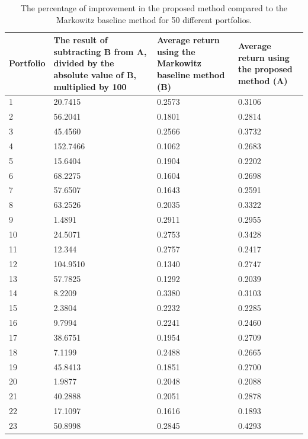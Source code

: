 \documentclass[preprint,12pt,authoryear]{elsarticle}
\begin{document}
\begin{longtable}{ p{}  p{} p{} p{} }
\caption{The percentage of improvement in the proposed method compared to the Markowitz baseline method for 50 different portfolios.}
\label{table:improvement}
\hline 
\textbf{Portfolio} & \textbf{The result of subtracting B from A, divided by the absolute value of B, multiplied by 100} & \textbf{Average return using the Markowitz baseline method (B)} & \textbf{Average return using the proposed method (A)} \\ 
\hline
\endhead
1& 20.7415 & 0.2573 & 0.3106 \\
2 & 56.2041 & 0.1801 & 0.2814 \\
3 & 45.4560 & 0.2566& 0.3732 \\
4 & 152.7466& 0.1062& 0.2683 \\
5& 15.6404& 0.1904& 0.2202 \\
6& 68.2275& 0.1604& 0.2698 \\
7 & 57.6507& 0.1643& 0.2591 \\
8 & 63.2526& 0.2035& 0.3322                    \\
9& 1.4891& 0.2911& 0.2955                    \\
10& 24.5071& 0.2753& 0.3428                    \\
11 & 12.344 & 0.2757 & 0.2417                    \\
12 & 104.9510 & 0.1340& 0.2747                    \\
13 & 57.7825& 0.1292& 0.2039                    \\
14 & 8.2209& 0.3380& 0.3103                    \\
15 & 2.3804 & 0.2232& 0.2285                    \\
16 & 9.7994 & 0.2241& 0.2460                    \\
17 & 38.6751 & 0.1954& 0.2709                    \\
18 & 7.1199 & 0.2488 & 0.2665                    \\
19 & 45.8413& 0.1851 & 0.2700                    \\
20 & 1.9877& 0.2048 & 0.2088                    \\
21 & 40.2888 & 0.2051 & 0.2878                    \\
22 & 17.1097  & 0.1616 & 0.1893                    \\
23 & 50.8998 & 0.2845  & 0.4293                    \\

\end{longtable}
\end{document}
